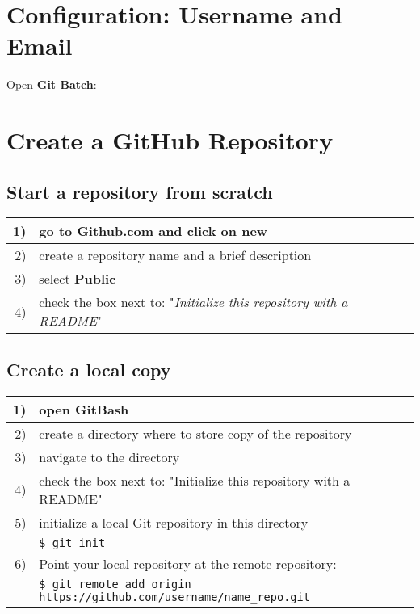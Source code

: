 \documentclass[a4paper,12pt]{report}
\newcommand{\code}[1]{\texttt{#1} }
\begin{document}
\section{Configuration: Username and Email}
Open \textbf{Git Batch}:
\begin{tcolorbox}
\end{tcolorbox}

\section{Create a GitHub Repository}
\subsection{Start a repository from scratch}
\begin{table}[H]
\centering
\begin{tabular}{|r|l|}
  \hline
  1) & go to \textbf{Github.com} and click on new \\
	\hline
	2) & create a repository name and a brief description \\
		\hline
	3) & select \textbf{Public} \\
		\hline
	4) & check the box next to: "\textit{Initialize this repository with a README}" \\
  \hline \hline
\end{tabular}
\end{table}

\subsection{Create a local copy}
\begin{table}[H]
\centering
\begin{tabular}{|r|l|}
  \hline
	\hline
  1) & open \textbf{GitBash} \\
	  \hline 
	2) & create a directory where to store copy of the repository \\
	  \hline 
	3) & navigate to the directory \\
	  \hline 
	4) & check the box next to: "Initialize this repository with a README" \\
	  \hline 
	5) & initialize a local Git repository in this directory \\
	   & \code{\$ \textcolor[rgb]{0,0,1}{git} init } \\
	  \hline 
	6) & Point your local repository at the remote repository: \\
	   & \code{\$ \textcolor[rgb]{0,0,1}{git} remote add origin \textcolor[rgb]{0,0.58,0}{https://github.com/username/name\_repo.git}} \\
  \hline 
\end{tabular}
\end{table}
\end{document}

